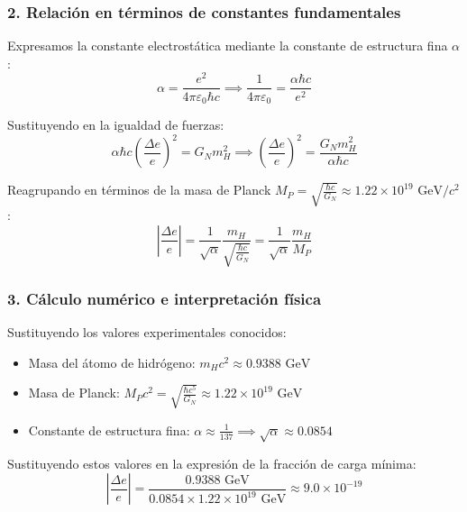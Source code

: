 \begin{problema}
\subsubsection*{2. Relación en términos de constantes fundamentales}

Expresamos la constante electrostática mediante la constante de estructura fina $\alpha$:
\begin{equation*}
\alpha = \frac{e^2}{4\pi\varepsilon_0 \hbar c} \implies \frac{1}{4\pi\varepsilon_0} = \frac{\alpha \hbar c}{e^2}
\end{equation*}

Sustituyendo en la igualdad de fuerzas:
\begin{equation*}
\alpha \hbar c \left( \frac{\Delta e}{e} \right)^2 = G_N m_H^2 \implies \left( \frac{\Delta e}{e} \right)^2 = \frac{G_N m_H^2}{\alpha \hbar c}
\end{equation*}

Reagrupando en términos de la masa de Planck $M_P = \sqrt{\frac{\hbar c}{G_N}} \approx 1.22 \times 10^{19} \text{ GeV}/c^2$:
\begin{equation*}
\left| \frac{\Delta e}{e} \right| = \frac{1}{\sqrt{\alpha}} \frac{m_H}{\sqrt{\frac{\hbar c}{G_N}}} = \frac{1}{\sqrt{\alpha}} \frac{m_H}{M_P}
\end{equation*}

\subsubsection*{3. Cálculo numérico e interpretación física}

Sustituyendo los valores experimentales conocidos:
\begin{itemize}
    \item Masa del átomo de hidrógeno: $m_H c^2 \approx 0.9388 \text{ GeV}$
    \item Masa de Planck: $M_P c^2 = \sqrt{\frac{\hbar c^5}{G_N}} \approx 1.22 \times 10^{19} \text{ GeV}$
    \item Constante de estructura fina: $\alpha \approx \frac{1}{137} \implies \sqrt{\alpha} \approx 0.0854$
\end{itemize}

Sustituyendo estos valores en la expresión de la fracción de carga mínima:
\begin{equation*}
\left| \frac{\Delta e}{e} \right| = \frac{0.9388 \text{ GeV}}{0.0854 \times 1.22 \times 10^{19} \text{ GeV}} \approx 9.0 \times 10^{-19}
\end{equation*}


\end{problema}
